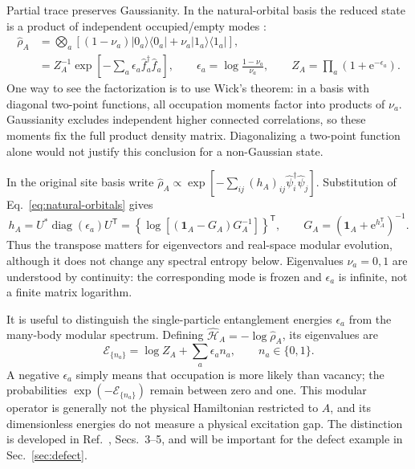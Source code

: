 \documentclass[aps,prb,onecolumn,nofootinbib,superscriptaddress]{revtex4-2}
\newcommand{\Id}{\mathbf{1}}
\newcommand{\e}{\mathrm{e}}
\newcommand{\ket}[1]{\lvert #1\rangle}
\newcommand{\bra}[1]{\langle #1\rvert}
\begin{document}
Partial trace preserves Gaussianity. In the natural-orbital basis the
reduced state is a product of independent occupied/empty modes
\cite{Peschel2003}:
\begin{align}
 \hat\rho_A
 &=\bigotimes_a\left[
 (1-\nu_a)\ket{0_a}\bra{0_a}
 +\nu_a\ket{1_a}\bra{1_a}\right],
 \label{eq:rho-product}\\
 &=Z_A^{-1}\exp\!\left[-\sum_a\epsilon_a\hat f_a^\dagger\hat f_a\right],
 \qquad
 \epsilon_a=\log\frac{1-\nu_a}{\nu_a},\qquad
 Z_A=\prod_a(1+\e^{-\epsilon_a}).
 \label{eq:rho-modular}
\end{align}
One way to see the factorization is to use Wick's theorem: in a basis with
diagonal two-point functions, all occupation moments factor into products
of $\nu_a$. Gaussianity excludes independent higher connected correlations,
so these moments fix the full product density matrix. Diagonalizing a
two-point function alone would not justify this conclusion for a
non-Gaussian state.

In the original site basis write
$\hat\rho_A\propto\exp[-\sum_{ij}(h_A)_{ij}
\hat\psi_i^\dagger\hat\psi_j]$. Substitution of
Eq.~\eqref{eq:natural-orbitals} gives
\begin{equation}
 h_A=U^*\operatorname{diag}(\epsilon_a)U^{\mathsf T}
 =\left\{\log[(\Id_A-G_A)G_A^{-1}]\right\}^{\mathsf T},
 \qquad
 G_A=(\Id_A+\e^{h_A^{\mathsf T}})^{-1}.
 \label{eq:transpose}
\end{equation}
Thus the transpose matters for eigenvectors and real-space modular
evolution, although it does not change any spectral entropy below.
Eigenvalues $\nu_a=0,1$ are understood by continuity: the corresponding
mode is frozen and $\epsilon_a$ is infinite, not a finite matrix logarithm.

It is useful to distinguish the single-particle entanglement energies
$\epsilon_a$ from the many-body modular spectrum. Defining
$\hat{\mathcal H}_A=-\log\hat\rho_A$, its eigenvalues are
\begin{equation}
 \mathcal E_{\{n_a\}}=\log Z_A+\sum_a\epsilon_a n_a,
 \qquad n_a\in\{0,1\}.
 \label{eq:manybody-modular}
\end{equation}
A negative $\epsilon_a$ simply means that occupation is more likely than
vacancy; the probabilities $\exp(-\mathcal E_{\{n_a\}})$ remain between
zero and one. This modular operator is generally not the physical
Hamiltonian restricted to $A$, and its dimensionless energies do not
measure a physical excitation gap. The distinction is developed in
Ref.~\cite{PeschelEisler2009}, Secs.~3--5, and will be important for the
defect example in Sec.~\ref{sec:defect}.
\end{document}
